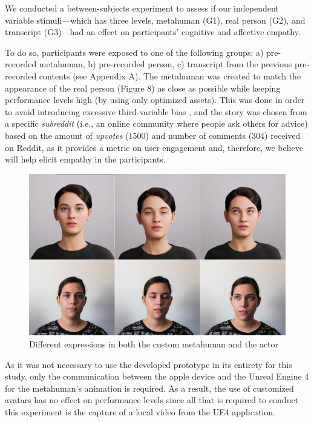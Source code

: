 We conducted a between-subjects experiment to assess if our independent variable stimuli---which has three levels, metahuman (G1), real person (G2), and transcript (G3)---had an effect on participants' cognitive and affective empathy.

To do so, participants were exposed to one of the following groups: a) pre-recorded metahuman, b) pre-recorded person, c) transcript from the previous pre-recorded contents (see Appendix A). The metahuman was created to match the appearance of the real person (Figure 8) as close as possible while keeping performance levels high (by using only optimized assets). This was done in order to avoid introducing excessive third-variable bias \cite{ROT19}, and the story was chosen from a specific \textit{subreddit} (i.e., an online community where people ask others for advice) based on the amount of \textit{upvotes} (1500) and number of comments (304) received on Reddit, as it provides a metric on user engagement and, therefore, we believe will help elicit empathy in the participants.

\begin{figure}[h!]
\includegraphics[width=\textwidth]{figures/personavatar.jpg}
\centering
\caption{Different expressions in both the custom metahuman and the actor}
\end{figure}

As it was not necessary to use the developed prototype in its entirety for this study, only the communication between the apple device and the Unreal Engine 4 for the metahuman's animation is required. As a result, the use of customized avatars has no effect on performance levels since all that is required to conduct this experiment is the capture of a local video from the UE4 application.

